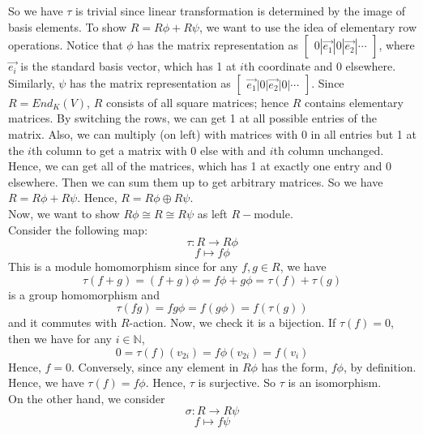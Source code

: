 \documentclass[12pt]{amsart}
\newcommand{\N}{\mathbb{N}}
\begin{document}
So we have $\tau$ is trivial since linear transformation is determined by the image of basis elements. To show $R=R\phi+R\psi$, we want to use the idea of elementary row operations. Notice that $\phi$ has the matrix representation as $\begin{bmatrix}
    0 |\vec{e_1}|0|\vec{e_2}|\cdots
\end{bmatrix}$, where $\vec{e_i}$ is the standard basis vector, which has 1 at $i$th coordinate and 0 elsewhere. Similarly, $\psi$ has the matrix representation as $\begin{bmatrix}
    \vec{e_1}|0|\vec{e_2}|0|\cdots
\end{bmatrix}$. Since $R=End_K(V)$, $R$ consists of all square matrices; hence $R$ contains elementary matrices. By switching the rows, we can get 1 at all possible entries of the matrix. Also, we can multiply (on left) with matrices with 0 in all entries but 1 at the $i$th column to get a matrix with 0 else with and $i$th column unchanged. Hence, we can get all of the matrices, which has 1 at exactly one entry and 0 elsewhere. Then we can sum them up to get arbitrary matrices. So we have $R=R\phi+ R\psi$. Hence, $R=R\phi\oplus R\psi$.\\
Now, we want to show $R\phi\cong R\cong R\psi$ as left $R-$module.\\
Consider the following map:
\[\tau: R\to R\phi\]
\[f\mapsto f\phi\]
This is a module homomorphism since for any $f,g\in R$, we have 
\[\tau(f+g)=(f+g)\phi=f\phi+g\phi=\tau(f)+\tau(g)\]
is a group homomorphism and 
\[\tau(fg)=fg\phi=f(g\phi)=f(\tau(g))\]
and it commutes with $R$-action. Now, we check it is a bijection. If $\tau(f)=0$, then we have for any $i\in \N$, 
\[0=\tau(f)(v_{2i})=f\phi(v_{2i})=f(v_i)\]
Hence, $f=0$. Conversely, since any element in $R\phi$ has the form, $f\phi$, by definition. Hence, we have $\tau(f)=f\phi$. Hence, $\tau$ is surjective. So $\tau$ is an isomorphism.\\
On the other hand, we consider
\[\sigma:R\to R\psi\]
\[f\mapsto f\psi\]
\end{document}
